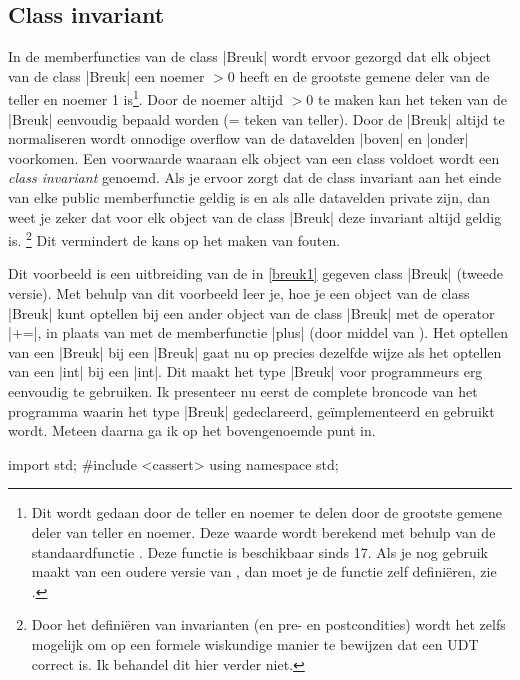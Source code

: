 \begin{cpplstShortInline}
\section{Class invariant}
In de memberfuncties van de class |Breuk| wordt ervoor gezorgd dat elk object van de class |Breuk| een noemer $>0$ heeft en de grootste gemene deler van de teller en noemer 1 is\footnote{%
	Dit wordt gedaan door de teller en noemer te delen door de grootste gemene deler van teller en noemer.
	Deze waarde wordt berekend met behulp van de standaardfunctie .
	Deze functie is beschikbaar sinds \Cpp{}17.
	Als je nog gebruik maakt van een oudere versie van \Cpp{}, dan moet je de functie  zelf definiëren, zie .
}.
Door de noemer altijd $>0$ te maken kan het teken van de |Breuk| eenvoudig bepaald worden (= teken van teller). 
Door de |Breuk| altijd te normaliseren wordt onnodige overflow van de datavelden |boven| en |onder| voorkomen. 
Een voorwaarde waaraan elk object van een class voldoet wordt een \emph{class invariant} genoemd. 
Als je ervoor zorgt dat de class invariant aan het einde van elke public memberfunctie geldig is en als alle datavelden private zijn, dan weet je zeker dat voor elk object van de class |Breuk| deze invariant altijd geldig is.%
\footnote{%
    Door het definiëren van invarianten (en pre- en postcondities) wordt het zelfs mogelijk om op een formele wiskundige manier te bewijzen dat een UDT correct is. Ik behandel dit hier verder niet.
}
Dit vermindert de kans op het maken van fouten.

\label{breuk2}
Dit voorbeeld is een uitbreiding van de in \cref{breuk1} gegeven class |Breuk| (tweede versie). 
Met behulp van dit voorbeeld leer je, hoe je een object van de class |Breuk| kunt optellen bij een ander object van de class |Breuk| met
de operator |+=|, in plaats van met de memberfunctie |plus| (door middel van \emph{}).
Het optellen van een |Breuk| bij een |Breuk| gaat nu op precies dezelfde wijze als het optellen van een |int| bij een |int|. 
Dit maakt het type |Breuk| voor programmeurs erg eenvoudig te gebruiken. 
Ik presenteer nu eerst de complete broncode van het programma  waarin het type |Breuk| gedeclareerd, geïmplementeerd en gebruikt wordt. Meteen daarna ga ik op het bovengenoemde punt in.

\begin{cpplstfragment}[mathescape=true]
import std;
#include <cassert>
using namespace std;


\end{cpplstfragment}
\end{cpplstShortInline}
